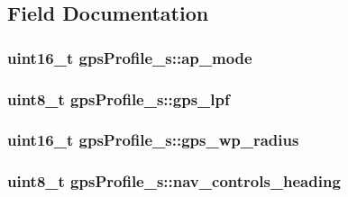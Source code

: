 \subsection{Field Documentation}
\hypertarget{structgpsProfile__s_affedd769fe7355056583175bfb557429}{
\subsubsection[{ap\+\_\+mode}]{\setlength{\rightskip}{0pt plus 5cm}uint16\+\_\+t gps\+Profile\+\_\+s\+::ap\+\_\+mode}}\label{structgpsProfile__s_affedd769fe7355056583175bfb557429}
\hypertarget{structgpsProfile__s_a383ea6e3f307624f7ee2046beeb7b79e}{
\subsubsection[{gps\+\_\+lpf}]{\setlength{\rightskip}{0pt plus 5cm}uint8\+\_\+t gps\+Profile\+\_\+s\+::gps\+\_\+lpf}}\label{structgpsProfile__s_a383ea6e3f307624f7ee2046beeb7b79e}
\hypertarget{structgpsProfile__s_ae7f0087acbaa8041ebeb1d4fc1185468}{
\subsubsection[{gps\+\_\+wp\+\_\+radius}]{\setlength{\rightskip}{0pt plus 5cm}uint16\+\_\+t gps\+Profile\+\_\+s\+::gps\+\_\+wp\+\_\+radius}}\label{structgpsProfile__s_ae7f0087acbaa8041ebeb1d4fc1185468}
\hypertarget{structgpsProfile__s_ac8e53759a891c01d9e68294c8458411d}{
\subsubsection[{nav\+\_\+controls\+\_\+heading}]{\setlength{\rightskip}{0pt plus 5cm}uint8\+\_\+t gps\+Profile\+\_\+s\+::nav\+\_\+controls\+\_\+heading}}\label{structgpsProfile__s_ac8e53759a891c01d9e68294c8458411d}
